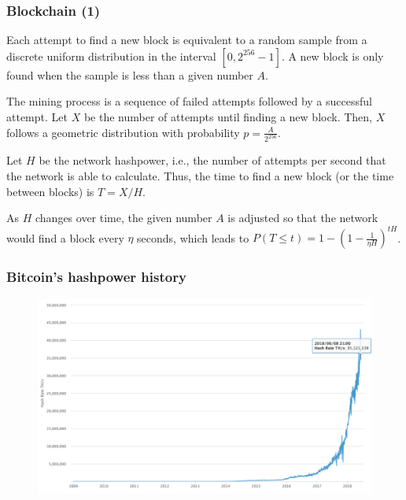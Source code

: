 \documentclass{beamer}
\begin{document}
\begin{frame}
\frametitle{Blockchain (1)}

Each attempt to find a new block is equivalent to a random sample from a discrete uniform distribution in the interval $[0, 2^{256}-1]$. A new block is only found when the sample is less than a given number $A$.

The mining process is a sequence of failed attempts followed by a successful attempt. Let $X$ be the number of attempts until finding a new block. Then, $X$ follows a geometric distribution with probability $p = \frac{A}{2^{256}}$.

Let $H$ be the network hashpower, i.e., the number of attempts per second that the network is able to calculate. Thus, the time to find a new block (or the time between blocks) is $T = X/H$.

As $H$ changes over time, the given number $A$ is adjusted so that the network would find a block every $\eta$ seconds, which leads to $P(T \le t) = 1 - \left(1 - \frac{1}{\eta H} \right)^{tH}$.
\end{frame}


\begin{frame}
\frametitle{Bitcoin's hashpower history}
\begin{figure}
\includegraphics[width=\textwidth]{./images-defense/bitcoin-H-history.png}
\end{figure}
\end{frame}
\end{document}
